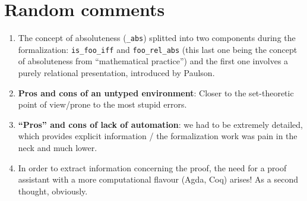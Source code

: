 \section{Random comments}

\begin{enumerate}
\item The concept of absoluteness (\verb|_abs|) splitted into two components
  during the formalization: \verb|is_foo_iff| and \verb|foo_rel_abs| (this last one
  being the concept of absoluteness from  “mathematical practice”) and
  the first one involves a purely relational presentation, introduced
  by Paulson.
\item  \textbf{Pros and cons of an untyped environment}: Closer to the
  set-theoretic point of view/prone to the most stupid errors.
\item \textbf{“Pros” and cons of lack of automation}: we had to be extremely
  detailed, which provides explicit information / the formalization
  work was pain in the neck and much lower.
\item In order to extract information concerning the proof, the need for a
  proof assistant with a more computational flavour (Agda, Coq)
  arises! As a second thought, obviously.
\end{enumerate}

